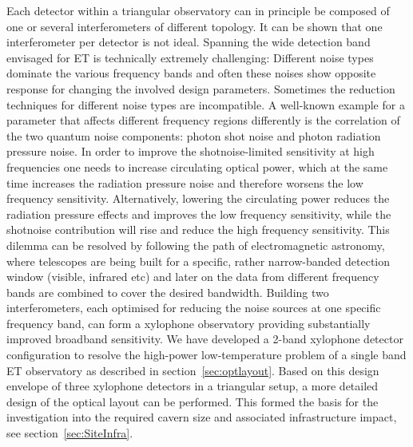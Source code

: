 Each detector within a triangular observatory can in principle be composed of
one or several interferometers of different topology. It can be shown
that one interferometer per detector is not ideal.
Spanning the wide detection band envisaged for ET is technically
extremely challenging: Different noise types dominate the various
frequency bands and often these noises show opposite response for
changing the involved design parameters. Sometimes the reduction
techniques for different noise types are incompatible. 
A well-known example for a parameter that affects different frequency
regions differently is the correlation of the two quantum noise
components: photon shot noise and photon radiation pressure
noise. In order to improve the shotnoise-limited sensitivity at high
frequencies one needs to increase circulating optical power,
which at the same time increases the radiation pressure noise and therefore worsens
the low frequency sensitivity. Alternatively, lowering the circulating
power reduces the radiation pressure effects and improves the low frequency sensitivity,
while the shotnoise contribution will rise and reduce the high frequency
sensitivity. 
This dilemma can be resolved by following the path of electromagnetic
astronomy, where telescopes are being built for a specific, rather
narrow-banded detection window (visible, infrared etc) and later on
the data from different frequency bands are combined to cover the
desired bandwidth.  Building two interferometers, each optimised
for reducing the noise sources at one specific frequency band, can
form a xylophone observatory providing substantially improved
broadband sensitivity. 
We have developed a
2-band xylophone detector configuration to resolve the high-power
low-temperature problem of a single band ET observatory as described
in section~\ref{sec:optlayout}.  Based on this design envelope of
three xylophone detectors in a triangular setup, a more detailed
design of the optical layout can be performed. 
This formed the basis for the investigation into the required cavern
size and associated infrastructure impact,
see section~\ref{sec:SiteInfra}.

